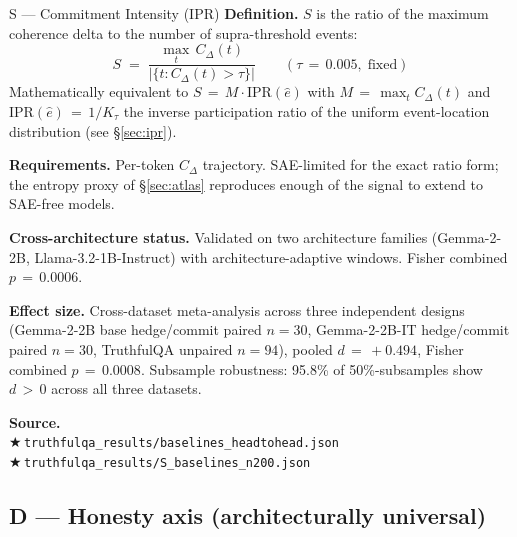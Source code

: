 \documentclass[11pt,letterpaper]{article}
\newcommand{\repro}[1]{%
  \textcolor{fathomgreen}{\footnotesize$\bigstar$\,\texttt{#1}}}
\begin{document}
\begin{mcard}{S --- Commitment Intensity (IPR)}
\textbf{Definition.} $S$ is the ratio of the maximum coherence delta to the
number of supra-threshold events:
\[
S \;=\; \frac{\max_t\,C_\Delta(t)}{|\{t : C_\Delta(t)>\tau\}|}
\qquad (\tau\,=\,0.005,\;\text{fixed})
\]
Mathematically equivalent to $S\,=\,M\cdot\text{IPR}(\hat{e})$ with
$M\,=\,\max_t C_\Delta(t)$ and $\text{IPR}(\hat{e})\,=\,1/K_\tau$ the
inverse participation ratio of the uniform event-location distribution
(see \S\ref{sec:ipr}).
\vspace{2pt}

\textbf{Requirements.} Per-token $C_\Delta$ trajectory. SAE-limited for the
exact ratio form; the entropy proxy of \S\ref{sec:atlas} reproduces enough
of the signal to extend to SAE-free models.
\vspace{2pt}

\textbf{Cross-architecture status.} Validated on two architecture families
(Gemma-2-2B, Llama-3.2-1B-Instruct) with architecture-adaptive windows.
Fisher combined $p\,=\,0.0006$.
\vspace{2pt}

\textbf{Effect size.} Cross-dataset meta-analysis across three independent
designs (Gemma-2-2B base hedge/commit paired $n\!=\!30$, Gemma-2-2B-IT
hedge/commit paired $n\!=\!30$, TruthfulQA unpaired $n\!=\!94$), pooled
$d\,=\,+0.494$, Fisher combined $p\,=\,0.0008$. Subsample robustness:
95.8\% of 50\%-subsamples show $d\,>\,0$ across all three datasets.
\vspace{2pt}

\textbf{Source.}\\
\repro{truthfulqa\_results/baselines\_headtohead.json}\\
\repro{truthfulqa\_results/S\_baselines\_n200.json}
\end{mcard}

\subsection{D --- Honesty axis (architecturally universal)}
\end{document}
